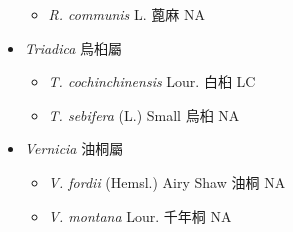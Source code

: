 \begin{itemize}
  \begin{itemize}
        \item[] \textit{R. communis} L.  蓖麻   NA
  \end{itemize}
 \item[] \textit{Triadica} 烏桕屬
                                
  \begin{itemize}
        \item[] \textit{T. cochinchinensis} Lour.  白桕   LC
        \item[] \textit{T. sebifera} (L.) Small  烏桕   NA
  \end{itemize}
 \item[] \textit{Vernicia} 油桐屬
                                
  \begin{itemize}
        \item[] \textit{V. fordii} (Hemsl.) Airy Shaw  油桐   NA
        \item[] \textit{V. montana} Lour.  千年桐   NA
  \end{itemize}
  \end{itemize}
